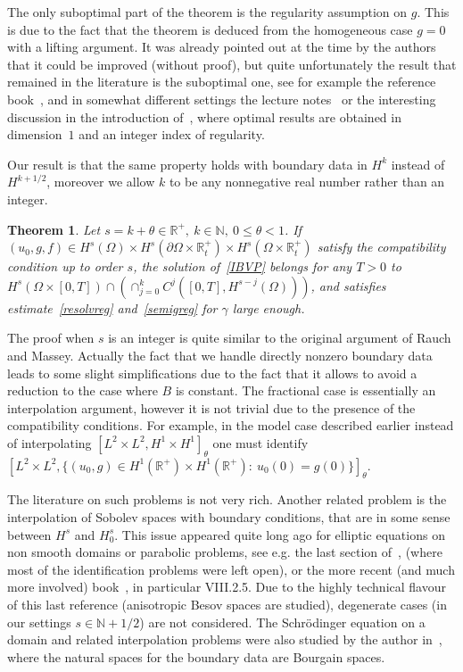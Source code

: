 \documentclass[10pt]{amsart}
\newtheorem{theo}{Theorem}[section]
\theoremstyle{definition}\newtheorem{defi}[theo]{Definition}\newtheorem{rema}[theo]{Remark}\newtheorem{exam}[theo]{Example}\newtheorem{exem}[theo]{Example}\newtheorem{nota}[theo]{Notation}
\newcommand{\R}{\mathbb{R}}
\newcommand{\N}{\mathbb{N}}
\begin{document}
The only suboptimal part of the theorem is the regularity assumption on $g$. This is due to the fact that the theorem is deduced from the homogeneous case $g=0$ with a lifting argument. It was already pointed out at the time by the authors that it could be improved (without proof), but quite unfortunately the result that remained in the literature is the suboptimal one, see for example the reference book~\cite{Benzoni3}, and in somewhat different settings the lecture notes~\cite{Met2} or the interesting discussion in the introduction of~\cite{lanigu}, where optimal results are obtained in dimension~$1$ and an integer index of regularity.


Our result is that the same property holds with boundary data in $H^k$ instead of $H^{k+1/2}$, moreover we allow $k$ to be any nonnegative real number rather than an integer.


\begin{theo}\label{mainth}
Let $s=k+\theta\in \R^+,\ k\in \N,\ 0\leq \theta<1$. If $(u_0,g,f)\in H^s(\Omega)\times H^{s}(\partial \Omega\times \R_t^+)
\times H^s(\Omega\times \R_t^+)$ satisfy the compatibility condition up to order $s$, the solution of~\eqref{IBVP} belongs for any $T>0$ to $H^s(\Omega\times [0,T])\cap (\cap_{j=0}^k C^j([0,T],H^{s-j}(\Omega)))$, and satisfies estimate~\eqref{resolvreg} and~\eqref{semigreg} for $\gamma$ large enough.
\end{theo}


The proof when $s$ is an integer is quite similar to the original argument of Rauch and Massey. Actually the fact that we handle directly nonzero boundary data leads to some slight simplifications due to the fact that it allows to avoid a reduction to the case where $B$ is constant. The fractional case is essentially an interpolation argument, however it is not trivial due to the presence of the compatibility conditions. For example, in the model case described earlier instead of interpolating $[L^2\times L^2,H^1\times H^1]_\theta$ one must identify $[L^2\times L^2,\{(u_0,g)\in H^1(\R^+)\times H^1(\R^+):\ u_0(0)=g(0)\}]_\theta$.


The literature on such problems is not very rich. Another related problem is the interpolation of Sobolev spaces with boundary conditions, that are in some sense between $H^s$ and $H^s_0$. This issue appeared quite long ago for elliptic equations on non smooth domains or parabolic problems, see e.g. the last section of~\cite{Grisvard}, \cite[Sections~14-17 of Chapter~4]{lionsmagenes2} (where most of the identification problems were left open), or the more recent (and much more involved) book~\cite{Amann2}, in particular VIII.2.5. Due to the highly technical flavour of this last reference (anisotropic Besov spaces are studied), degenerate cases (in our settings $s\in \N+1/2$) are not considered. The Schr\"odinger equation on a domain and related interpolation problems were also studied by the author in~\cite{Audiard7}, where the natural spaces for the boundary data are Bourgain spaces.
\end{document}
